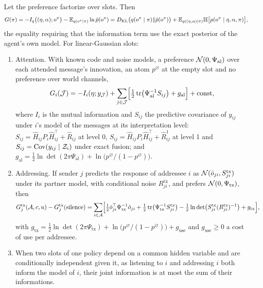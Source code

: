 \begin{proposition}\label{prop:fw-efe-communication}
Let the preference factorize over slots. Then
\[
G(\pi)=-I_q\bigl((\eta,\alpha);o^\pi\bigr)-\mathbb{E}_{q(o^\pi\mid\pi)}\ln\tilde p(o^\pi)=D_{\mathrm{KL}}\bigl(q(o^\pi\mid\pi)\Vert\tilde p(o^\pi)\bigr)+\mathbb{E}_{q((\eta,\alpha)\mid\pi)}\mathbb H\bigl[p(o^\pi\mid\eta,\alpha,\pi)\bigr],
\]
the equality requiring that the information term use the exact posterior of the agent's own model. For linear-Gaussian slots:
\begin{enumerate}
\item[(a)] Attention. With known code and noise models, a preference $\mathcal{N}(0,\Psi_{\mathrm{al}})$ over each attended message's innovation, an atom $p^\varnothing$ at the empty slot and no preference over world channels,
\[
G_i(\mathcal J)=-I_i(\eta;y_{\mathcal J})+\sum_{j\in\mathcal J}\Bigl[\tfrac12\operatorname{tr}\bigl(\Psi_{\mathrm{al}}^{-1}S_{ij}\bigr)+g_{\mathrm{al}}\Bigr]+\mathrm{const},
\]
where $I_i$ is the mutual information and $S_{ij}$ the predictive covariance of $y_{ij}$ under $i$'s model of the messages at its interpretation level: $S_{ij}=\hat H_{ij}P_i\hat H_{ij}^\top+\hat R_{ij}$ at level 0, $S_{ij}=\hat H_{ij}P_i\hat H_{ij}^\top+\hat R^1_{ij}$ at level 1 and $S_{ij}=\operatorname{Cov}(y_{ij}\mid\mathcal Z_i)$ under exact fusion; and $g_{\mathrm{al}}=\tfrac12\ln\det(2\pi\Psi_{\mathrm{al}})+\ln\bigl(p^\varnothing/(1-p^\varnothing)\bigr)$.
\item[(b)] Addressing. If sender $j$ predicts the response of addressee $i$ as $\mathcal{N}(\bar o_{ji},S^{\mathrm{tx}}_{ji})$ under its partner model, with conditional noise $R^{\mathrm{tx}}_{ji}$, and prefers $\mathcal{N}(0,\Psi_{\mathrm{tx}})$, then
\[
G^{\mathrm{tx}}_j(\mathcal A,c,u)-G^{\mathrm{tx}}_j(\text{silence})=\sum_{i\in\mathcal A}\Bigl[\tfrac12\bar o_{ji}^\top\Psi_{\mathrm{tx}}^{-1}\bar o_{ji}+\tfrac12\operatorname{tr}\bigl(\Psi_{\mathrm{tx}}^{-1}S^{\mathrm{tx}}_{ji}\bigr)-\tfrac12\ln\det\bigl(S^{\mathrm{tx}}_{ji}(R^{\mathrm{tx}}_{ji})^{-1}\bigr)+g_{\mathrm{tx}}\Bigr],
\]
with $g_{\mathrm{tx}}=\tfrac12\ln\det(2\pi\Psi_{\mathrm{tx}})+\ln\bigl(p^\varnothing/(1-p^\varnothing)\bigr)+g_{\mathrm{use}}$ and $g_{\mathrm{use}}\ge0$ a cost of use per addressee.
\item[(c)] When two slots of one policy depend on a common hidden variable and are conditionally independent given it, as listening to $i$ and addressing $i$ both inform the model of $i$, their joint information is at most the sum of their informations.
\end{enumerate}
\end{proposition}


